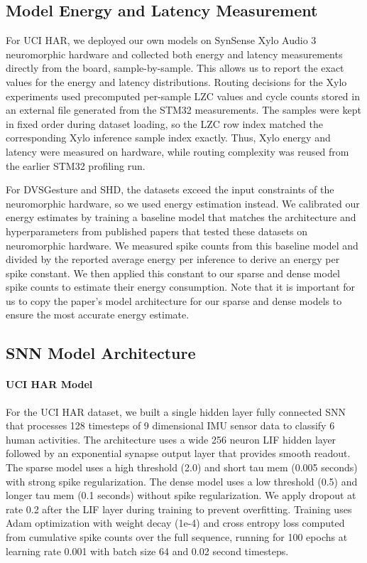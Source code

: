 \documentclass[conference]{IEEEtran}
\begin{document}
\subsection{Model Energy and Latency Measurement}

For UCI HAR, we deployed our own models on SynSense Xylo Audio 3 neuromorphic hardware and collected both energy and latency measurements directly from the board, sample-by-sample. This allows us to report the exact values for the energy and latency distributions. Routing decisions for the Xylo experiments used precomputed per-sample LZC values and cycle counts stored in an external file generated from the STM32 measurements. The samples were kept in fixed order during dataset loading, so the LZC row index matched the corresponding Xylo inference sample index exactly. Thus, Xylo energy and latency were measured on hardware, while routing complexity was reused from the earlier STM32 profiling run.

For DVSGesture and SHD, the datasets exceed the input constraints of the neuromorphic hardware, so we used energy estimation instead. We calibrated our energy estimates by training a baseline model that matches the architecture and hyperparameters from published papers that tested these datasets on neuromorphic hardware. We measured spike counts from this baseline model and divided by the reported average energy per inference to derive an energy per spike constant. We then applied this constant to our sparse and dense model spike counts to estimate their energy consumption. Note that it is important for us to copy the paper's model architecture for our sparse and dense models to ensure the most accurate energy estimate.

\subsection{SNN Model Architecture}

\paragraph*{UCI HAR Model}
For the UCI HAR dataset, we built a single hidden layer fully connected SNN that processes 128 timesteps of 9 dimensional IMU sensor data to classify 6 human activities. The architecture uses a wide 256 neuron LIF hidden layer followed by an exponential synapse output layer that provides smooth readout. The sparse model uses a high threshold (2.0) and short tau mem (0.005 seconds) with strong spike regularization. The dense model uses a low threshold (0.5) and longer tau mem (0.1 seconds) without spike regularization. We apply dropout at rate 0.2 after the LIF layer during training to prevent overfitting. Training uses Adam optimization with weight decay (1e-4) and cross entropy loss computed from cumulative spike counts over the full sequence, running for 100 epochs at learning rate 0.001 with batch size 64 and 0.02 second timesteps.
\end{document}

